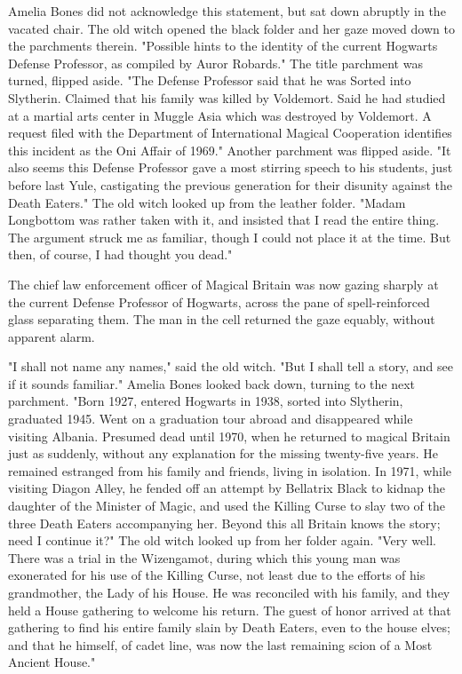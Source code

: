 Amelia Bones did not acknowledge this statement, but sat down abruptly in the
vacated chair. The old witch opened the black folder and her gaze moved down to
the parchments therein. "Possible hints to the identity of the current Hogwarts
Defense Professor, as compiled by Auror Robards." The title parchment was
turned, flipped aside. "The Defense Professor said that he was Sorted into
Slytherin. Claimed that his family was killed by Voldemort. Said he had studied
at a martial arts center in Muggle Asia which was destroyed by Voldemort. A
request filed with the Department of International Magical Cooperation
identifies this incident as the Oni Affair of 1969." Another parchment was
flipped aside. "It also seems this Defense Professor gave a most stirring
speech to his students, just before last Yule, castigating the previous
generation for their disunity against the Death Eaters." The old witch looked
up from the leather folder. "Madam Longbottom was rather taken with it, and
insisted that I read the entire thing. The argument struck me as familiar,
though I could not place it at the time. But then, of course, I had thought you
dead."

The chief law enforcement officer of Magical Britain was now gazing sharply at
the current Defense Professor of Hogwarts, across the pane of spell-reinforced
glass separating them. The man in the cell returned the gaze equably, without
apparent alarm.

"I shall not name any names," said the old witch. "But I shall tell a story,
and see if it sounds familiar." Amelia Bones looked back down, turning to the
next parchment. "Born 1927, entered Hogwarts in 1938, sorted into Slytherin,
graduated 1945. Went on a graduation tour abroad and disappeared while visiting
Albania. Presumed dead until 1970, when he returned to magical Britain just as
suddenly, without any explanation for the missing twenty-five years. He
remained estranged from his family and friends, living in isolation. In 1971,
while visiting Diagon Alley, he fended off an attempt by Bellatrix Black to
kidnap the daughter of the Minister of Magic, and used the Killing Curse to
slay two of the three Death Eaters accompanying her. Beyond this all Britain
knows the story; need I continue it?" The old witch looked up from her folder
again. "Very well. There was a trial in the Wizengamot, during which this young
man was exonerated for his use of the Killing Curse, not least due to the
efforts of his grandmother, the Lady of his House. He was reconciled with his
family, and they held a House gathering to welcome his return. The guest of
honor arrived at that gathering to find his entire family slain by Death
Eaters, even to the house elves; and that he himself, of cadet line, was now
the last remaining scion of a Most Ancient House."

